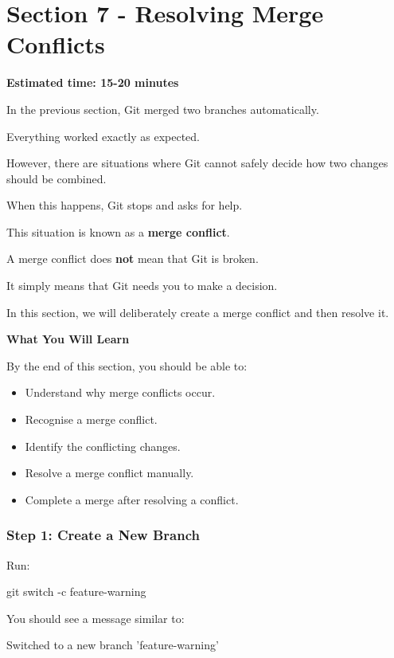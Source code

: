 \documentclass{csc2059practical}
\begin{document}
\clearpage
\section{Section 7 - Resolving Merge Conflicts}
\begin{infobox}
\textbf{Estimated time: 15-20 minutes}
\end{infobox}
In the previous section, Git merged two branches automatically.

Everything worked exactly as expected.

However, there are situations where Git cannot safely decide how two changes should be combined.

When this happens, Git stops and asks for help.

This situation is known as a \textbf{merge conflict}.

A merge conflict does \textbf{not} mean that Git is broken.

It simply means that Git needs you to make a decision.

In this section, we will deliberately create a merge conflict and then resolve it.

\begin{learningoutcomes}
\textbf{What You Will Learn}\par
\medskip
By the end of this section, you should be able to:

\begin{itemize}
  \item Understand why merge conflicts occur.
  \item Recognise a merge conflict.
  \item Identify the conflicting changes.
  \item Resolve a merge conflict manually.
  \item Complete a merge after resolving a conflict.
\end{itemize}
\end{learningoutcomes}
\subsubsection{Step 1: Create a New Branch}
Run:

\begin{terminalplain}
git switch -c feature-warning
\end{terminalplain}
You should see a message similar to:

\begin{terminalplain}
Switched to a new branch 'feature-warning'
\end{terminalplain}
\end{document}
